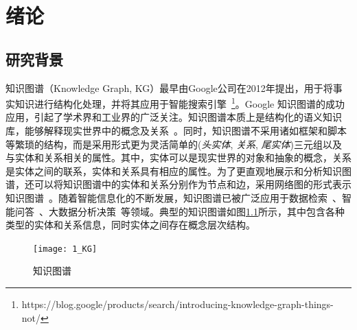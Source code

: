 \documentclass[algorithmlist, AutoFakeBold, AutoFakeSlant, figurelist, tablelist, nomlist, engineering]{seuthesix}
\begin{document}
\tableofcontents
\mainmatter  %

\chapter{绪论}
\section{研究背景}
知识图谱（Knowledge Graph, KG）最早由Google公司在2012年提出，用于将事实知识进行结构化处理，并将其应用于智能搜索引擎~\footnote{https://blog.google/products/search/introducing-knowledge-graph-things-not/}。Google 知识图谱的成功应用，引起了学术界和工业界的广泛关注。知识图谱本质上是结构化的语义知识库，能够解释现实世界中的概念及关系~\cite{nickel2015review}。同时，知识图谱不采用诸如框架和脚本等繁琐的结构，而是采用形式更为灵活简单的(\textit{头实体}, \textit{关系}, \textit{尾实体})三元组以及与实体和关系相关的属性。其中，实体可以是现实世界的对象和抽象的概念，关系是实体之间的联系，实体和关系具有相应的属性。为了更直观地展示和分析知识图谱，还可以将知识图谱中的实体和关系分别作为节点和边，采用网络图的形式表示知识图谱~\cite{noy2019industry}。随着智能信息化的不断发展，知识图谱已被广泛应用于数据检索~\cite{rinaldi2021semantic,sarhan2021open,li2021research}、智能问答~\cite{li2021improving,do2021developing}、大数据分析决策~\cite{zhou2021geoscience,abu2021relational}等领域。典型的知识图谱如图\ref{1_KG}所示，其中包含各种类型的实体和关系信息，同时实体之间存在概念层次结构。
\begin{figure}
  \centering
  \texttt{[image: 1\_KG]}
  \caption{知识图谱}
  \label{1_KG}
\end{figure}
\end{document}
